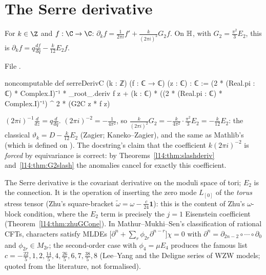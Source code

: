 \section{The Serre derivative}\label{l14:sec:serre}

\begin{definition}\label{l14:def:serre}
For $k\in\Z$ and $f:\C\to\C$: $\partial_kf = \frac{1}{2\pi i}f' + \frac{k}{(2\pi i)^2}G_2f$. On $\mathbb{H}$, with
$G_2 = \frac{\pi^2}3E_2$, this is $\partial_kf = q\frac{df}{dq} - \frac{k}{12}E_2f$.
\end{definition}
\noindent File .
\begin{leancode}
noncomputable def serreDerivC (k : ℤ) (f : ℂ → ℂ) (z : ℂ) : ℂ :=
  (2 * (Real.pi : ℂ) * Complex.I)⁻¹ * _root_.deriv f z
    + (k : ℂ) * ((2 * (Real.pi : ℂ) * Complex.I)⁻¹) ^ 2 * (G2C z * f z)
\end{leancode}
\begin{dictionary}
$(2\pi i)^{-1}\frac{d}{dz} = q\frac{d}{dq}$. $(2\pi i)^{-2} = -\frac1{4\pi^2}$, so $\frac{k}{(2\pi i)^2}G_2 = -\frac{k}{4\pi^2}\cdot
\frac{\pi^2}{3}E_2 = -\frac k{12}E_2$: the classical $\vartheta_k = D - \frac k{12}E_2$ (Zagier; Kaneko--Zagier), and the same
as Mathlib's  (which is defined on ). The docstring's claim that the coefficient
$k(2\pi i)^{-2}$ is \emph{forced} by equivariance is correct: by Theorems~\ref{l14:thm:slashderiv} and~\ref{l14:thm:G2slash}
the anomalies cancel for exactly this coefficient.
\end{dictionary}
\begin{physics}
The Serre derivative is the covariant derivative on the moduli space of tori; $E_2$ is the connection. It is the operation of
inserting the zero mode $L_{[0]}$ of the \emph{torus} stress tensor (Zhu's square-bracket $\tilde\omega = \omega -
\frac c{24}\mathbf 1$): this is the content of Zhu's $\omega$-block condition, where the $E_2$ term is precisely the $j=1$
Eisenstein coefficient (Theorem~\ref{l14:thm:zhuGCone}). In Mathur--Mukhi--Sen's classification of rational CFTs, characters
satisfy MLDEs $\bigl[\partial^n + \sum_r\phi_{2r}\partial^{n-r}\bigr]\chi = 0$ with $\partial^n = \partial_{2n-2}\circ\cdots
\circ\partial_0$ and $\phi_{2r}\in M_{2r}$; the second-order case with $\phi_4 = \mu E_4$ produces the famous list
$c = -\frac{22}5,1,2,\frac{14}5,4,\frac{26}5,6,7,\frac{38}5,8$ (Lee--Yang and the Deligne series of WZW models; quoted from
the literature, not formalised).
\end{physics}

